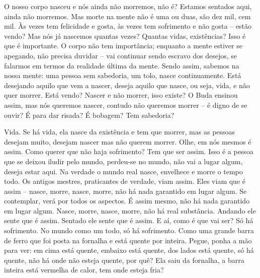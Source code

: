 O nosso corpo nasceu e nós ainda não morremos, não é? Estamos
sentados aqui, ainda não morremos. Mas morte na mente não é uma ou
duas, são dez mil, cem mil. Às vezes tem felicidade e gosta, às vezes
tem sofrimento e não gosta – estão vendo? Mas nós já nascemos quantas
vezes? Quantas vidas, existências? Isso é que é importante. O corpo não
tem importância; enquanto a mente estiver se apegando, não precisa
duvidar – vai continuar sendo escravo dos desejos, se falarmos em
termos da realidade última da mente. Sendo assim, sabemos na nossa
mente: uma pessoa sem sabedoria, um tolo, nasce continuamente. Está
desejando aquilo que vem a nascer, deseja aquilo que nasce, ou seja,
vida, e não quer morrer. Está vendo? Nascer e não morrer, isso existe?
O Buda ensinou assim, mas nós queremos nascer, contudo não queremos
morrer – é digno de se ouvir? É para dar risada? É bobagem? Tem
sabedoria? 

Vida. Se há vida, ela nasce da existência e tem que morrer, mas as
pessoas desejam muito, desejam nascer mas não querem morrer. Olhe, em
nós mesmos é assim. Como querer que não haja sofrimento? Tem que ser
assim. Isso é a pessoa que se deixou iludir pelo mundo, perdeu-se no
mundo, não vai a lugar algum, deseja estar aqui. Na verdade o mundo
real nasce, envelhece e morre o tempo todo. Os antigos mestres,
praticantes de verdade, viam assim. Eles viam que é assim – nasce,
morre, nasce, morre, não há nada garantido em lugar algum. Se
contemplar, verá por todos os aspectos. É assim mesmo, não há nada
garantido em lugar algum. Nasce, morre, nasce, morre, não há real
substância. Andando ele sente que é assim. Sentado ele sente que é
assim. E aí, como é que vai ser? Só há sofrimento. No mundo como um
todo, só há sofrimento. Como uma grande barra de ferro que foi posta na
fornalha e está quente por inteira. Pegue, ponha a mão para ver: em
cima está quente, embaixo está quente, dos lados está quente, só há
quente, não há onde não esteja quente, por quê? Ela saiu da fornalha, a
barra inteira está vermelha de calor, tem onde esteja fria? 


